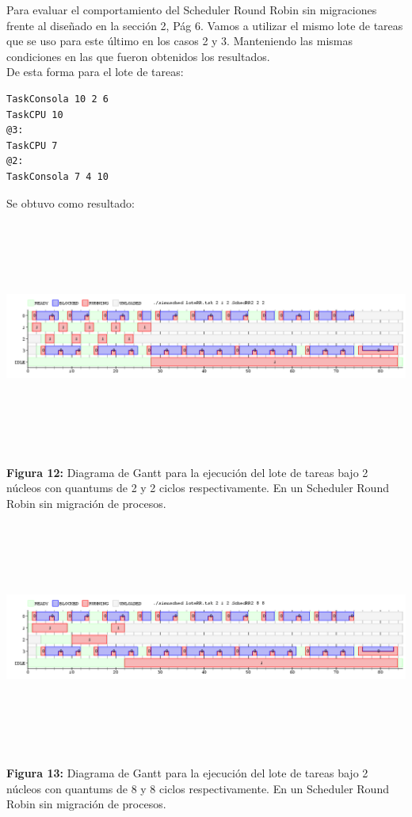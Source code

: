 \documentclass[a4paper]{article}
\begin{document}
\bigskip 
 
Para evaluar el comportamiento del Scheduler Round Robin sin migraciones frente al diseñado en la sección 2, Pág 6. Vamos a utilizar el mismo lote de tareas que se uso para este último en los casos 2 y 3. Manteniendo las mismas condiciones en las que fueron obtenidos los resultados.\\
De esta forma para el lote de tareas:
 
 \begin{codesnippet}
	\begin{verbatim}
TaskConsola 10 2 6
TaskCPU 10
@3:
TaskCPU 7
@2:
TaskConsola 7 4 10
	\end{verbatim}
	\end{codesnippet}
	
Se obtuvo como resultado:	

\includegraphics[width=\textwidth,height=3.0in,keepaspectratio
]{imagenes/ej8/2eje1.png} \\
\begin {flushleft}
\textbf{Figura 12:} Diagrama de Gantt para la ejecuci\'on del lote de tareas bajo 2 n\'ucleos con quantums de 2 y 2 ciclos respectivamente. En un Scheduler Round Robin sin migración de procesos.
\end{flushleft}	
 
  
  \includegraphics[width=\textwidth,height=3.0in,keepaspectratio
]{imagenes/ej8/2eje2.png} \\
\begin {flushleft}
\textbf{Figura 13:} Diagrama de Gantt para la ejecuci\'on del lote de tareas bajo 2 n\'ucleos con quantums de 8 y 8 ciclos respectivamente. En un Scheduler Round Robin sin migración de procesos.
\end{flushleft}	
\end{document}
